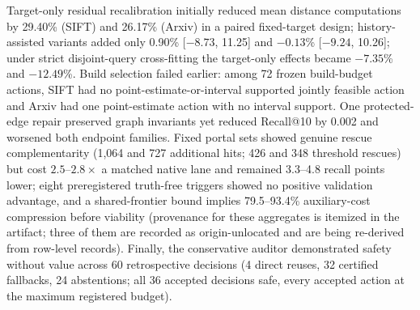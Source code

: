 \documentclass{article}
\begin{document}
Target-only residual recalibration initially reduced mean distance computations by 29.40\% (SIFT) and 26.17\%
(Arxiv) in a paired fixed-target design; history-assisted variants added only 0.90\% [$-8.73$, 11.25] and
$-0.13$\% [$-9.24$, 10.26]; under strict disjoint-query cross-fitting the target-only effects became
$-7.35$\% and $-12.49$\%. Build selection failed earlier: among 72 frozen build-budget actions, SIFT had no
point-estimate-or-interval supported jointly feasible action and Arxiv had one point-estimate action with no
interval support. One protected-edge repair preserved graph invariants yet reduced Recall@10 by 0.002 and
worsened both endpoint families. Fixed portal sets showed genuine rescue complementarity (1{,}064 and 727
additional hits; 426 and 348 threshold rescues) but cost $2.5$--$2.8\times$ a matched native lane and
remained 3.3--4.8 recall points lower; eight preregistered truth-free triggers showed no positive validation
advantage, and a shared-frontier bound implies 79.5--93.4\% auxiliary-cost compression before viability
(provenance for these aggregates is itemized in the artifact; three of them are recorded as
origin-unlocated and are being re-derived from row-level records). Finally, the conservative auditor
demonstrated safety without value across 60 retrospective decisions (4 direct reuses, 32 certified
fallbacks, 24 abstentions; all 36 accepted decisions safe, every accepted action at the maximum registered
budget).
\end{document}
